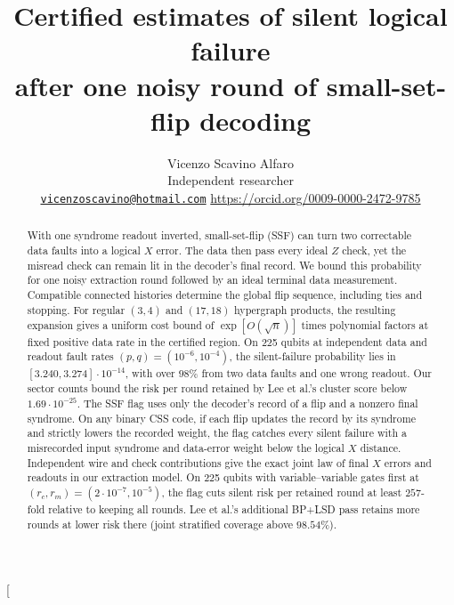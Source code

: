 \documentclass[10pt,twocolumn]{article}
\title{Certified estimates of silent logical failure\\
after one noisy round of small-set-flip decoding}
\author{Vicenzo Scavino Alfaro\\[2pt]
  {\small Independent researcher}\\
  {\small\urlstyle{same}\href{mailto:vicenzoscavino@hotmail.com}{\nolinkurl{vicenzoscavino@hotmail.com}}
  \quad\url{https://orcid.org/0009-0000-2472-9785}}}
\date{}
\theoremstyle{definition}
\begin{document}
\twocolumn[{\begin{@twocolumnfalse}
\maketitle

\begin{abstract}
With one syndrome readout inverted, small-set-flip (SSF) can turn
two correctable data faults into a logical $X$ error. The data then
pass every ideal $Z$ check, yet the misread check can remain lit in
the decoder's final record. We bound this probability for one noisy
extraction round followed by an ideal terminal data measurement.
Compatible connected histories determine the global flip sequence,
including ties and stopping. For regular $(3,4)$ and $(17,18)$
hypergraph products, the resulting expansion gives a uniform cost
bound of $\exp[O(\sqrt n)]$ times polynomial factors at fixed positive
data rate in the certified region. On 225 qubits at independent data
and readout fault rates $(p,q)=(10^{-6},10^{-4})$, the silent-failure
probability lies in $[3.240,3.274]\cdot10^{-14}$, with over $98\%$ from two data
faults and one wrong readout. Our sector counts bound the risk per round
retained by Lee et al.'s cluster score below $1.69\cdot10^{-25}$.
The SSF flag uses only the decoder's record of a flip and a nonzero
final syndrome. On any binary CSS
code, if each flip updates the record by its syndrome and strictly lowers the
recorded weight, the flag catches every silent failure with a
misrecorded input syndrome and data-error weight below the logical
$X$ distance. Independent wire and check contributions give the exact
joint law of final $X$ errors and readouts in our extraction model.
On 225 qubits with variable--variable gates first at
$(r_c,r_m)=(2\cdot10^{-7},10^{-5})$, the flag cuts silent risk per
retained round at least $257$-fold relative to keeping all rounds.
Lee et al.'s additional BP+LSD pass retains more rounds at lower risk
there (joint stratified coverage above $98.54\%$).
\end{abstract}
\begingroup
\setlength{\columnwidth}{\textwidth}
\begin{figure}[H]
\centering
{}
\end{figure}
\end{@twocolumnfalse}}
\end{document}
